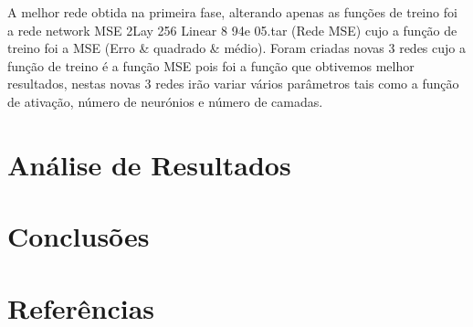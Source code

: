 \documentclass[10pt]{article}
\begin{document}
\vspace{1cm}
A melhor rede obtida na primeira fase, alterando apenas as funções de
treino foi a rede network MSE 2Lay 256 Linear 8 94e 05.tar (Rede MSE) cujo a 
função de treino foi a MSE (Erro & quadrado & médio).
Foram criadas novas 3 redes cujo a função de treino é a função MSE pois foi
a função que obtivemos melhor resultados, nestas novas 3 redes irão variar vários parâmetros
tais como a função de ativação, número de neurónios e número de camadas.




  \newpage

\section{Análise de Resultados}\label{sec:ev-da-org}

\vspace{6cm}
\section{Conclusões}\label{sec:an-da-info-fin-da-org}

\vspace{3cm}

\newpage

\section{Referências}\label{sec:sup-inf-utl}
\cite{Binance:2021}



\pagebreak
\end{document}
